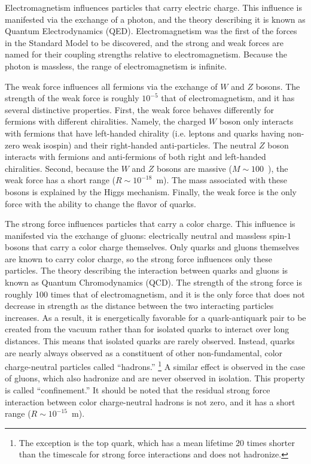 Electromagnetism influences particles that carry electric charge.  This influence
is manifested via the exchange of a photon, and the theory describing it
is known as Quantum Electrodynamics (QED).
Electromagnetism was the first of the forces in the Standard Model to be discovered,
and the strong and weak forces are named for their coupling strengths relative to 
electromagnetism.  Because the photon is massless, the range of electromagnetism 
is infinite.

The weak force influences all fermions via the exchange of $W$ and $Z$ bosons.
The strength of the weak force is roughly $10^{-5}$ that of electromagnetism,
and it has several distinctive properties.  First, the weak force behaves differently
for fermions with different chiralities.  Namely, the charged $W$ boson only interacts 
with fermions that have left-handed chirality (i.e. leptons and quarks having 
non-zero weak isospin) and their right-handed anti-particles. The neutral $Z$ boson interacts 
with fermions and anti-fermions of both right and left-handed chiralities.  Second, because 
the $W$ and $Z$ bosons are massive ($M \sim 100$~\GeV), the weak force has a short 
range ($R \sim 10^{-18}$~m).  The mass associated with these bosons is explained by the Higgs mechanism.
Finally, the weak force is the only force with the ability to change the flavor of quarks.

The strong force influences particles that carry a color charge.  This influence is
manifested via the exchange of gluons: electrically neutral and massless spin-$1$ bosons that carry 
a color charge themselves.
Only quarks and gluons themselves are known 
to carry color charge, so the strong force influences only these particles.  
The theory describing the interaction between quarks and gluons is  known as Quantum Chromodynamics (QCD).
The strength 
of the strong force is roughly 100 times that of electromagnetism, and it is the only force 
that does not decrease in strength as the distance between the two interacting particles increases.  
As a result, it is energetically favorable for a quark-antiquark pair to be created from the 
vacuum rather than for isolated quarks to interact over long distances.  This means that 
isolated quarks are rarely observed.  Instead, quarks are nearly always observed as a 
constituent of other non-fundamental, color charge-neutral particles called ``hadrons.''
\footnote{The exception is the top quark, which has a mean lifetime 20 times shorter 
than the timescale for strong force interactions and does not hadronize.}  
A similar effect is observed in the case of gluons, which also hadronize and are never observed in isolation.
This property is called ``confinement.''  
It should be noted that the residual strong force interaction
between color charge-neutral hadrons is not zero, and it has a short range 
($R \sim 10^{-15}$~m).

